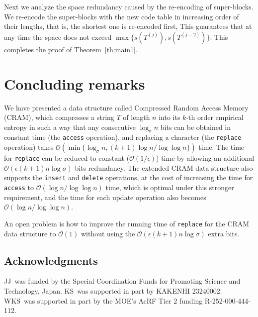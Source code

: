 \documentclass{llncs}
\newcommand{\Order}{\mathcal{O}}
\begin{document}
Next we analyze the space redundancy caused by the re-encoding of super-blocks.
We re-encode the super-blocks with the new code table in increasing order of their lengths,
that is, the shortest one is re-encoded first,
This guarantees that
at any time the space does not exceed $\max\{s(T^{(j)}), s(T^{(j-2)})\}$.
This completes the proof of Theorem~\ref{th:main1}.




\section{Concluding remarks}\label{sec:conclusion}

We have presented a data structure called Compressed Random Access Memory
(CRAM), which compresses a string $T$ of length $n$ into its $k$-th order
empirical entropy in such a way that any consecutive $\log_\sigma n$ bits
can be obtained in constant time (the \texttt{access} operation), and
replacing a character (the \texttt{replace} operation) takes
$\Order(\min\{\log_\sigma n, (k+1)\log n/\log\log n\})$ time.
The time for \texttt{replace} can be reduced to constant
($\Order(1/\epsilon)$) time
by allowing an additional $\Order(\epsilon(k+1) n\log\sigma)$ bits redundancy.
The extended CRAM data structure also supports the \texttt{insert} and
\texttt{delete} operations, at the cost of increasing the time for
\texttt{access} to $\Order(\log n/\log \log n)$ time, which is optimal under
this stronger requirement, and the time for each update operation also
becomes $\Order(\log n/\log \log n)$.

An open problem is how to improve the running time of \texttt{replace}
for the CRAM data structure to $\Order(1)$ without using the
$\Order(\epsilon(k+1) n\log\sigma)$ extra bits.




\subsection*{Acknowledgments}
JJ~was funded by the Special Coordination Funds for Promoting Science and
Technology, Japan.
KS~was supported in part by KAKENHI 23240002.
WKS~was supported in part by the MOE's AcRF Tier 2 funding
R-252-000-444-112.








\newpage

\appendix
\end{document}
